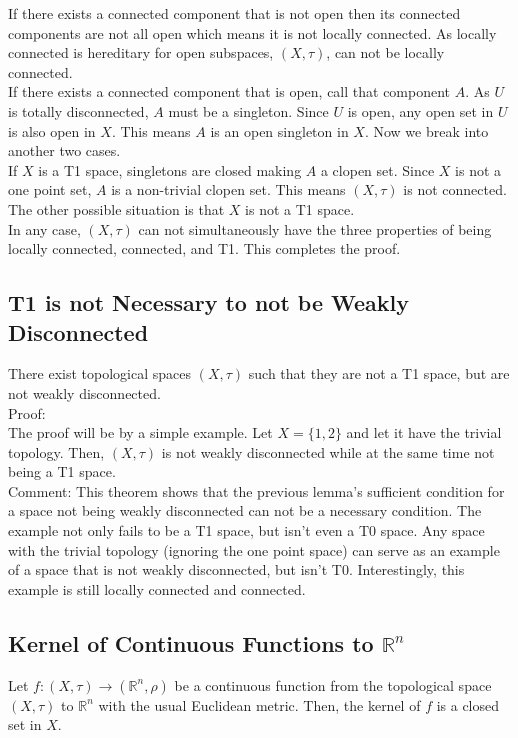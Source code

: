 \documentclass{article}
\begin{document}
If there exists a connected component that is not open then its connected components are not all open which means it is not locally connected. As locally connected is hereditary for open subspaces, $(X,\tau)$, can not be locally connected. \\

If there exists a connected component that is open, call that component $A$. As $U$ is totally disconnected, $A$ must be a singleton. Since $U$ is open, any open set in $U$ is also open in $X$. This means $A$ is an open singleton in $X$. Now we break into another two cases.\\

If $X$ is a T1 space, singletons are closed making $A$ a clopen set. Since $X$ is not a one point set, $A$ is a non-trivial clopen set. This means $(X,\tau)$ is not connected. \\

The other possible situation is that $X$ is not a T1 space.\\

In any case, $(X, \tau)$ can not simultaneously have the three properties of being locally connected, connected, and T1. This completes the proof.

\subsection{T1 is not Necessary to not be Weakly Disconnected}
There exist topological spaces $(X,\tau)$ such that they are not a T1 space, but are not weakly disconnected.\\

Proof:\\

The proof will be by a simple example. Let $X = \{1,2\}$ and let it have the trivial topology. Then, $(X,\tau)$ is not weakly disconnected while at the same time not being a T1 space.\\

Comment: This theorem shows that the previous lemma's sufficient condition for a space not being weakly disconnected can not be a necessary condition. The example not only fails to be a T1 space, but isn't even a T0 space. Any space with the trivial topology (ignoring the one point space) can serve as an example of a space that is not weakly disconnected, but isn't T0. Interestingly, this example is still locally connected and connected.

\subsection{Kernel of Continuous Functions to $ \mathbb{R}^n $}
Let $f: (X,\tau) \to (\mathbb{R}^n,\rho)$ be a continuous function from the topological space $(X,\tau)$ to $\mathbb{R}^n$ with the usual Euclidean metric. Then, the kernel of $f$ is a closed set in $X$.\\
\end{document}
